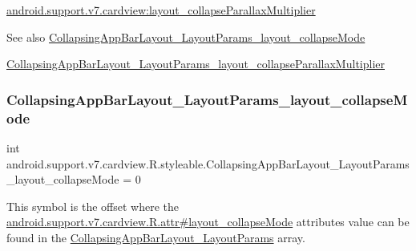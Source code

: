 {\ttfamily \hyperlink{classandroid_1_1support_1_1v7_1_1cardview_1_1R_1_1styleable_a9a9ccaf5bc1abaffc694f48a3f2504d3}{android.\+support.\+v7.\+cardview\+:layout\+\_\+collapse\+Parallax\+Multiplier}}

\begin{DoxySeeAlso}{See also}
\hyperlink{classandroid_1_1support_1_1v7_1_1cardview_1_1R_1_1styleable_a96f22ebb139de6418b43c78b653af717}{Collapsing\+App\+Bar\+Layout\+\_\+\+Layout\+Params\+\_\+layout\+\_\+collapse\+Mode} 

\hyperlink{classandroid_1_1support_1_1v7_1_1cardview_1_1R_1_1styleable_a9a9ccaf5bc1abaffc694f48a3f2504d3}{Collapsing\+App\+Bar\+Layout\+\_\+\+Layout\+Params\+\_\+layout\+\_\+collapse\+Parallax\+Multiplier} 
\end{DoxySeeAlso}
\mbox{\label{classandroid_1_1support_1_1v7_1_1cardview_1_1R_1_1styleable_a96f22ebb139de6418b43c78b653af717}} 
\subsubsection{\texorpdfstring{Collapsing\+App\+Bar\+Layout\+\_\+\+Layout\+Params\+\_\+layout\+\_\+collapse\+Mode}{CollapsingAppBarLayout\_LayoutParams\_layout\_collapseMode}}
{\footnotesize\ttfamily int android.\+support.\+v7.\+cardview.\+R.\+styleable.\+Collapsing\+App\+Bar\+Layout\+\_\+\+Layout\+Params\+\_\+layout\+\_\+collapse\+Mode = 0\hspace{0.3cm}{\ttfamily [static]}}

This symbol is the offset where the \hyperlink{classandroid_1_1support_1_1v7_1_1cardview_1_1R_1_1attr_ad533ba0bfa6adac0af8c0f41f719edef}{android.\+support.\+v7.\+cardview.\+R.\+attr\#layout\+\_\+collapse\+Mode} attribute\textquotesingle{}s value can be found in the \hyperlink{classandroid_1_1support_1_1v7_1_1cardview_1_1R_1_1styleable_a16f17ad190df56abdfbfa11e42898369}{Collapsing\+App\+Bar\+Layout\+\_\+\+Layout\+Params} array.

